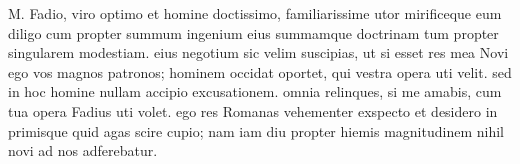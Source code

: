 


 M. Fadio, viro optimo et homine doctissimo, familiarissime utor mirificeque eum diligo cum propter summum ingenium eius summamque doctrinam tum propter singularem modestiam. eius negotium sic velim suscipias, ut si esset res mea Novi ego vos magnos patronos; hominem occidat oportet, qui vestra opera uti velit. sed in hoc homine nullam accipio excusationem. omnia relinques, si me amabis, cum tua opera Fadius uti volet. ego res Romanas vehementer exspecto et desidero in primisque quid agas scire cupio; nam iam diu propter hiemis magnitudinem nihil novi ad nos adferebatur.
